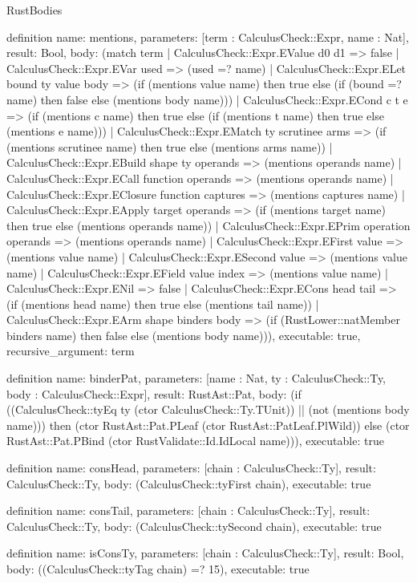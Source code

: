 \begin{lexlean}{RustBodies}
\begin{semanticmodule}
definition{
  name: mentions,
  parameters: [term : CalculusCheck::Expr, name : Nat],
  result: Bool,
  body: (match term
    | CalculusCheck::Expr.EValue d0 d1 => false
    | CalculusCheck::Expr.EVar used => (used =? name)
    | CalculusCheck::Expr.ELet bound ty value body => (if (mentions value name) then true else (if (bound =? name) then false else (mentions body name)))
    | CalculusCheck::Expr.ECond c t e => (if (mentions c name) then true else (if (mentions t name) then true else (mentions e name)))
    | CalculusCheck::Expr.EMatch ty scrutinee arms => (if (mentions scrutinee name) then true else (mentions arms name))
    | CalculusCheck::Expr.EBuild shape ty operands => (mentions operands name)
    | CalculusCheck::Expr.ECall function operands => (mentions operands name)
    | CalculusCheck::Expr.EClosure function captures => (mentions captures name)
    | CalculusCheck::Expr.EApply target operands => (if (mentions target name) then true else (mentions operands name))
    | CalculusCheck::Expr.EPrim operation operands => (mentions operands name)
    | CalculusCheck::Expr.EFirst value => (mentions value name)
    | CalculusCheck::Expr.ESecond value => (mentions value name)
    | CalculusCheck::Expr.EField value index => (mentions value name)
    | CalculusCheck::Expr.ENil => false
    | CalculusCheck::Expr.ECons head tail => (if (mentions head name) then true else (mentions tail name))
    | CalculusCheck::Expr.EArm shape binders body => (if (RustLower::natMember binders name) then false else (mentions body name))),
  executable: true,
  recursive_argument: term
}

definition{
  name: binderPat,
  parameters: [name : Nat, ty : CalculusCheck::Ty, body : CalculusCheck::Expr],
  result: RustAst::Pat,
  body: (if ((CalculusCheck::tyEq ty (ctor CalculusCheck::Ty.TUnit)) || (not (mentions body name))) then (ctor RustAst::Pat.PLeaf (ctor RustAst::PatLeaf.PlWild)) else (ctor RustAst::Pat.PBind (ctor RustValidate::Id.IdLocal name))),
  executable: true
}

definition{
  name: consHead,
  parameters: [chain : CalculusCheck::Ty],
  result: CalculusCheck::Ty,
  body: (CalculusCheck::tyFirst chain),
  executable: true
}

definition{
  name: consTail,
  parameters: [chain : CalculusCheck::Ty],
  result: CalculusCheck::Ty,
  body: (CalculusCheck::tySecond chain),
  executable: true
}

definition{
  name: isConsTy,
  parameters: [chain : CalculusCheck::Ty],
  result: Bool,
  body: ((CalculusCheck::tyTag chain) =? 15),
  executable: true
}


\end{semanticmodule}
\end{lexlean}
